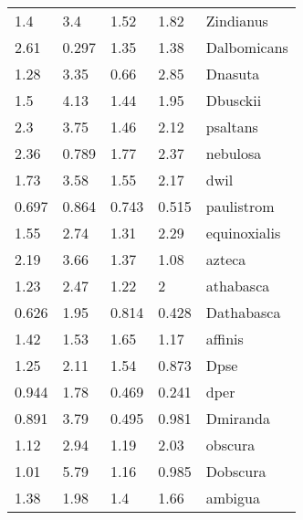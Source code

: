 \begin{tabular}{lllll}
            1.4 &             3.4 &            1.52 &            1.82 &               Zindianus \\
           2.61 &           0.297 &            1.35 &            1.38 &             Dalbomicans \\
           1.28 &            3.35 &            0.66 &            2.85 &                 Dnasuta \\
            1.5 &            4.13 &            1.44 &            1.95 &                Dbusckii \\
            2.3 &            3.75 &            1.46 &            2.12 &                psaltans \\
           2.36 &           0.789 &            1.77 &            2.37 &                nebulosa \\
           1.73 &            3.58 &            1.55 &            2.17 &                    dwil \\
          0.697 &           0.864 &           0.743 &           0.515 &              paulistrom \\
           1.55 &            2.74 &            1.31 &            2.29 &            equinoxialis \\
           2.19 &            3.66 &            1.37 &            1.08 &                  azteca \\
           1.23 &            2.47 &            1.22 &               2 &               athabasca \\
          0.626 &            1.95 &           0.814 &           0.428 &              Dathabasca \\
           1.42 &            1.53 &            1.65 &            1.17 &                 affinis \\
           1.25 &            2.11 &            1.54 &           0.873 &                    Dpse \\
          0.944 &            1.78 &           0.469 &           0.241 &                    dper \\
          0.891 &            3.79 &           0.495 &           0.981 &                Dmiranda \\
           1.12 &            2.94 &            1.19 &            2.03 &                 obscura \\
           1.01 &            5.79 &            1.16 &           0.985 &                Dobscura \\
           1.38 &            1.98 &             1.4 &            1.66 &                 ambigua \\

\end{tabular}
